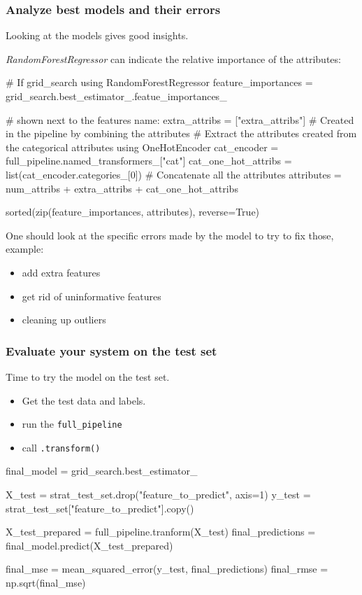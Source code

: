 \documentclass{article}
\begin{document}
    \subsubsection*{Analyze best models and their errors}
    Looking at the models gives good insights.

    \emph{RandomForestRegressor} can indicate the relative importance of the attributes:
    \begin{python}
        # If grid_search using RandomForestRegressor
        feature_importances = grid_search.best_estimator_.featue_importances_

        # shown next to the features name:
        extra_attribs = ["extra_attribs"]       # Created in the pipeline by combining the attributes
        # Extract the attributes created from the categorical attributes using OneHotEncoder
        cat_encoder = full_pipeline.named_transformers_["cat"]
        cat_one_hot_attribs = list(cat_encoder.categories_[0])
        # Concatenate all the attributes
        attributes = num_attribs + extra_attribs + cat_one_hot_attribs

        sorted(zip(feature_importances, attributes), reverse=True)
    \end{python}

    One should look at the specific errors made by the model to try to fix those, example:
    \begin{itemize}
        \item add extra features
        \item get rid of uninformative features
        \item cleaning up outliers
    \end{itemize}

    \subsubsection*{Evaluate your system on the test set}
        Time to try the model on the test set.
        \begin{itemize}
            \item Get the test data and labels.
            \item run the \verb;full_pipeline;
            \item call \verb;.transform();
        \end{itemize}

        \begin{python}
            final_model = grid_search.best_estimator_

            X_test = strat_test_set.drop("feature_to_predict", axis=1)
            y_test = strat_test_set["feature_to_predict"].copy()

            X_test_prepared = full_pipeline.tranform(X_test)
            final_predictions = final_model.predict(X_test_prepared)

            final_mse = mean_squared_error(y_test, final_predictions)
            final_rmse = np.sqrt(final_mse)
        \end{python}
\end{document}
